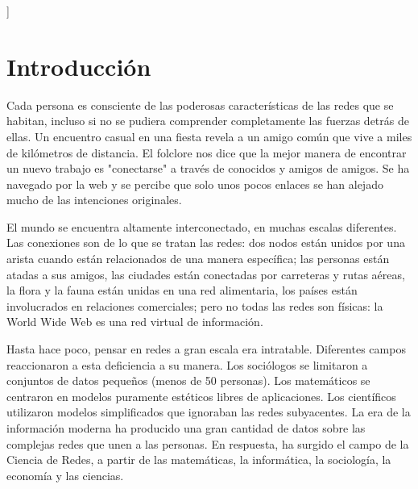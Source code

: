 \documentclass[a4paper,10pt,twocolumn]{article}
\begin{document}


\vspace{0.8cm}
]



\section{Introducción}\label{sec:intro}
  Cada persona es consciente de las poderosas características de las redes que se habitan, incluso si no se pudiera comprender completamente las fuerzas detrás de ellas. Un encuentro casual en una fiesta revela a un amigo común que vive a miles de kilómetros de distancia. El folclore nos dice que la mejor manera de encontrar un nuevo trabajo es "conectarse" a través de conocidos y amigos de amigos. Se ha navegado por la web y se percibe que solo unos pocos enlaces se han alejado mucho de las intenciones originales.

  El mundo se encuentra altamente interconectado, en muchas escalas diferentes. Las conexiones son de lo que se tratan las redes: dos nodos están unidos por una arista cuando están relacionados de una manera específica; las personas están atadas a sus amigos, las ciudades están conectadas por carreteras y rutas aéreas, la flora y la fauna están unidas en una red alimentaria, los países están involucrados en relaciones comerciales; pero no todas las redes son físicas: la World Wide Web es una red virtual de información.

  Hasta hace poco, pensar en redes a gran escala era intratable. Diferentes campos reaccionaron a esta deficiencia a su manera. Los sociólogos se limitaron a conjuntos de datos pequeños (menos de 50 personas). Los matemáticos se centraron en modelos puramente estéticos libres de aplicaciones. Los científicos utilizaron modelos simplificados que ignoraban las redes subyacentes. La era de la información moderna ha producido una gran cantidad de datos sobre las complejas redes que unen a las personas. En respuesta, ha surgido el campo de la Ciencia de Redes, a partir de las matemáticas, la informática, la sociología, la economía y las ciencias.
\end{document}

